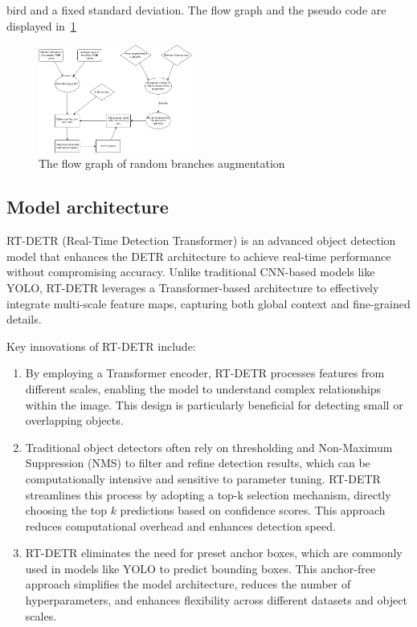 bird and a fixed standard deviation. The flow graph and the pseudo 
code are displayed in~\ref{png:random-branch}
\begin{figure}[H]
    \includegraphics[width=0.45\textwidth]{bracn_aug.png}
    \caption{The flow graph of random branches augmentation}
    \label{png:random-branch}
\end{figure}
\subsection{Model architecture}
RT-DETR (Real-Time Detection Transformer) is an advanced object detection model that enhances the DETR architecture to achieve real-time performance without compromising accuracy. Unlike traditional CNN-based models like YOLO, RT-DETR leverages a Transformer-based architecture to effectively integrate multi-scale feature maps, capturing both global context and fine-grained details.

Key innovations of RT-DETR include:
\begin{enumerate}
    \item  By employing a Transformer encoder, RT-DETR processes features from different scales, enabling the model to understand complex relationships within the image. This design is particularly beneficial for detecting small or overlapping objects.
    \item  Traditional object detectors often rely on thresholding and Non-Maximum Suppression (NMS) to filter and refine detection results, which can be computationally intensive and sensitive to parameter tuning. RT-DETR streamlines this process by adopting a top-k selection mechanism, directly choosing the top $k$ predictions based on confidence scores. This approach reduces computational overhead and enhances detection speed.
    \item  RT-DETR eliminates the need for preset anchor boxes, which are commonly used in models like YOLO to predict bounding boxes. This anchor-free approach simplifies the model architecture, reduces the number of hyperparameters, and enhances flexibility across different datasets and object scales. 
\end{enumerate}

